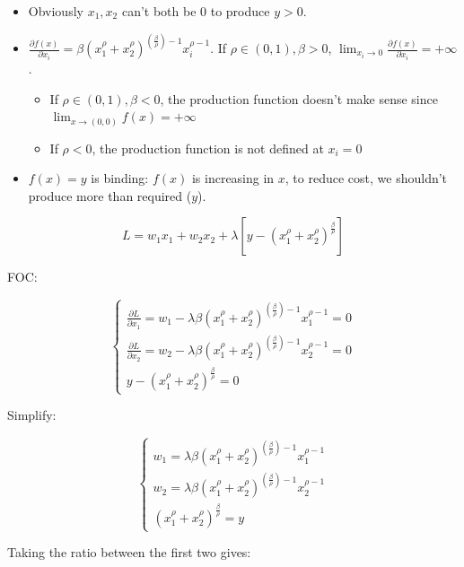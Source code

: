 \documentclass{article}
\begin{document}
\begin{itemize}
\item Obviously $x_1,x_2$ can't both be $0$ to produce $y>0$.
\item $\frac{\partial f(x)}{\partial x_i} = \beta (x_1^\rho + x_2^\rho)^{(\frac{\beta}{\rho}) - 1}x_i^{\rho - 1}$. If $\rho \in (0,1),\beta > 0$, $\lim_{x_i \to 0}\frac{\partial f(x)}{\partial x_i} = +\infty$. 
\begin{itemize}
\item If $\rho \in (0,1),\beta < 0$, the production function doesn't make sense since $\lim_{x \to (0,0)} f(x) = + \infty$
\item  If  $\rho < 0$, the production function is not defined at $x_i = 0$
\end{itemize}

\item $f(x) = y$ is binding: $f(x)$ is increasing in $x$, to reduce cost, we shouldn't produce more than required ($y$).
\end{itemize}

$$L =  w_1x_1 + w_2x_2 + \lambda [y -  (x_1^\rho + x_2^\rho)^{\frac{\beta}{\rho}}] $$ 

FOC:

\begin{equation}
    \begin{cases}
\frac{\partial L}{\partial x_1} =w_1 - \lambda \beta (x_1^\rho + x_2^\rho)^{(\frac{\beta}{\rho}) - 1}x_1^{\rho - 1}= 0 \\
\frac{\partial L}{\partial x_2} =w_2 - \lambda \beta (x_1^\rho + x_2^\rho)^{(\frac{\beta}{\rho}) - 1}x_2^{\rho - 1} = 0 \\
y -  (x_1^\rho + x_2^\rho)^{\frac{\beta}{\rho}} = 0
    \end{cases}
    \nonumber
\end{equation}

Simplify:

\begin{equation}
    \begin{cases}
 w_1 = \lambda \beta (x_1^\rho + x_2^\rho)^{(\frac{\beta}{\rho}) - 1}x_1^{\rho - 1} \\
 w_2 =\lambda \beta (x_1^\rho + x_2^\rho)^{(\frac{\beta}{\rho}) - 1}x_2^{\rho - 1} \\
(x_1^\rho + x_2^\rho)^{\frac{\beta}{\rho}} = y
    \end{cases}
    \label{eq:3_49_foc}   
\end{equation}

Taking the ratio between the first two gives:
\end{document}

